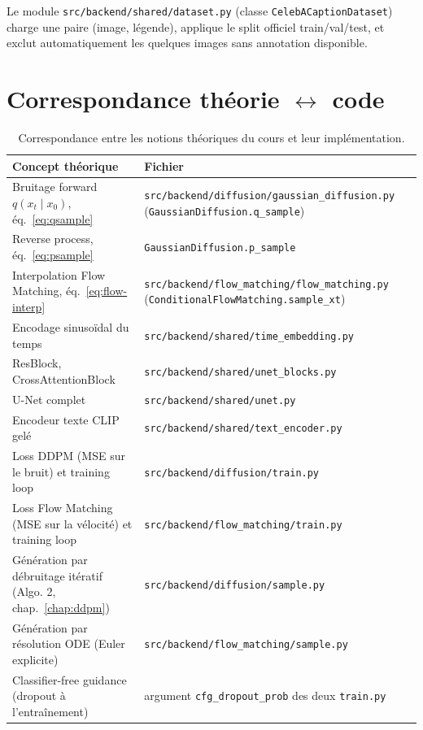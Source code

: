 Le module \texttt{src/backend/shared/dataset.py} (classe \texttt{CelebACaptionDataset}) charge une
paire (image, légende), applique le split officiel train/val/test, et exclut automatiquement les
quelques images sans annotation disponible.

\section{Correspondance théorie $\leftrightarrow$ code}

\begin{table}[h]
\centering
\small
\begin{tabular}{@{}p{5.4cm}p{9.2cm}@{}}
\toprule
\textbf{Concept théorique} & \textbf{Fichier} \\
\midrule
Bruitage forward $q(x_t\mid x_0)$, éq.~\eqref{eq:qsample} & \texttt{src/backend/diffusion/gaussian\_diffusion.py} \newline (\texttt{GaussianDiffusion.q\_sample}) \\
Reverse process, éq.~\eqref{eq:psample} & \texttt{GaussianDiffusion.p\_sample} \\
Interpolation Flow Matching, éq.~\eqref{eq:flow-interp} & \texttt{src/backend/flow\_matching/flow\_matching.py} \newline (\texttt{ConditionalFlowMatching.sample\_xt}) \\
Encodage sinusoïdal du temps & \texttt{src/backend/shared/time\_embedding.py} \\
ResBlock, CrossAttentionBlock & \texttt{src/backend/shared/unet\_blocks.py} \\
U-Net complet & \texttt{src/backend/shared/unet.py} \\
Encodeur texte CLIP gelé & \texttt{src/backend/shared/text\_encoder.py} \\
Loss DDPM (MSE sur le bruit) et training loop & \texttt{src/backend/diffusion/train.py} \\
Loss Flow Matching (MSE sur la vélocité) et training loop & \texttt{src/backend/flow\_matching/train.py} \\
Génération par débruitage itératif (Algo. 2, chap.~\ref{chap:ddpm}) & \texttt{src/backend/diffusion/sample.py} \\
Génération par résolution ODE (Euler explicite) & \texttt{src/backend/flow\_matching/sample.py} \\
Classifier-free guidance (dropout à l'entraînement) & argument \texttt{cfg\_dropout\_prob} des deux \texttt{train.py} \\
\bottomrule
\end{tabular}
\caption{Correspondance entre les notions théoriques du cours et leur implémentation.}
\end{table}

